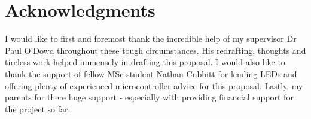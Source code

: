 \documentclass{sigchi}
\begin{document}
\newpage


\section{Acknowledgments}

I would like to first and foremost thank the incredible help of my supervisor Dr Paul O'Dowd throughout these tough circumstances. His redrafting, thoughts and tireless work helped immensely in drafting this proposal. I would also like to thank the support of fellow MSc student Nathan Cubbitt for lending LEDs and offering plenty of experienced microcontroller advice for this proposal. Lastly, my parents for there huge support - especially with providing financial support for the project so far. 

\balance{}



\end{document}
